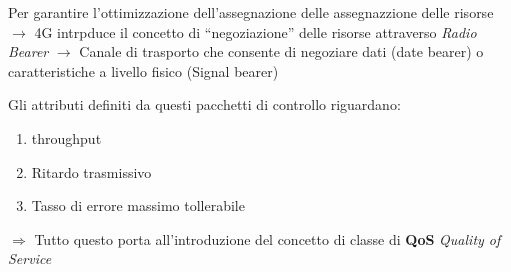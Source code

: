 \documentclass{article}
\begin{document}
Per garantire l'ottimizzazione dell'assegnazione delle assegnazzione delle risorse $\rightarrow$ 4G intrpduce il concetto di ``negoziazione'' delle risorse attraverso \textit{Radio Bearer} $\rightarrow$ Canale di trasporto che consente  di negoziare dati (date bearer) o caratteristiche a livello fisico (Signal bearer)

Gli attributi definiti da questi pacchetti di controllo riguardano:

\begin{enumerate}
    \item throughput
    \item Ritardo trasmissivo
    \item Tasso di errore massimo tollerabile
\end{enumerate}

$\Rightarrow$ Tutto questo porta all'introduzione del concetto di classe  di \textbf{QoS} \textit{Quality of Service}
\end{document}
